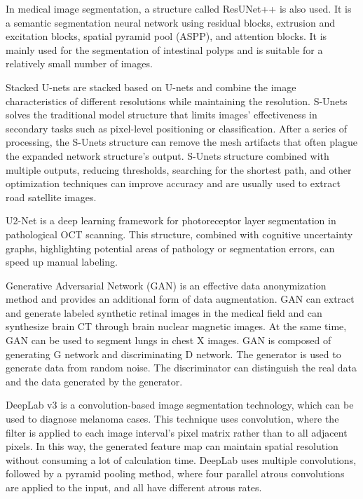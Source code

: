 \documentclass{article}
\begin{document}
In medical image segmentation, a structure called ResUNet++ is also used.
It is a semantic segmentation neural network using residual blocks, extrusion and excitation blocks, spatial pyramid pool (ASPP), and attention blocks.
It is mainly used for the segmentation of intestinal polyps and is suitable for a relatively small number of images.\cite{jha2019resunet++}

Stacked U-nets are stacked based on U-nets and combine the image characteristics of different resolutions while maintaining the resolution.
S-Unets solves the traditional model structure that limits images' effectiveness in secondary tasks such as pixel-level positioning or classification.\cite{shah2018stacked}
After a series of processing, the S-Unets structure can remove the mesh artifacts that often plague the expanded network structure's output.\cite{ghosh2018stacked}
S-Unets structure combined with multiple outputs, reducing thresholds, searching for the shortest path, and other optimization techniques can improve accuracy and are usually used to extract road satellite images.\cite{sun2018stacked}

U2-Net is a deep learning framework for photoreceptor layer segmentation in pathological OCT scanning.
This structure, combined with cognitive uncertainty graphs, highlighting potential areas of pathology or segmentation errors, can speed up manual labeling.\cite{orlando2019u2}

Generative Adversarial Network (GAN) is an effective data anonymization method and provides an additional form of data augmentation.
GAN can extract and generate labeled synthetic retinal images in the medical field and can synthesize brain CT through brain nuclear magnetic images.\cite{shin2018medical}
At the same time, GAN can be used to segment lungs in chest X images.
GAN is composed of generating G network and discriminating D network.
The generator is used to generate data from random noise.
The discriminator can distinguish the real data and the data generated by the generator.\cite{munawar2020segmentation}

DeepLab v3 is a convolution-based image segmentation technology, which can be used to diagnose melanoma cases.
This technique uses convolution, where the filter is applied to each image interval's pixel matrix rather than to all adjacent pixels.
In this way, the generated feature map can maintain spatial resolution without consuming a lot of calculation time.
DeepLab uses multiple convolutions, followed by a pyramid pooling method, where four parallel atrous convolutions are applied to the input, and all have different atrous rates.\cite{wang2018skin}
\end{document}
